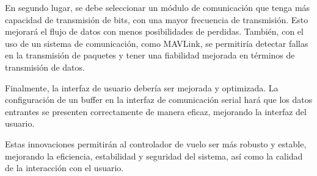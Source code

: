 En segundo lugar, se debe seleccionar un módulo de comunicación que tenga más capacidad de transmisión de bits, con  una mayor frecuencia de transmisión. Esto mejorará el flujo de datos con menos posibilidades de perdidas. También, con el uso de un sistema de comunicación, como MAVLink, se permitiría detectar fallas en la transmisión de paquetes y tener una fiabilidad mejorada en términos de transmisión de datos.\vspace{5px}

Finalmente, la interfaz de usuario debería ser mejorada y optimizada. La configuración de un buffer en la interfaz de comunicación serial hará que los datos entrantes se presenten correctamente de manera eficaz, mejorando la interfaz del usuario. \vspace{5px}

Estas innovaciones permitirán al controlador de vuelo ser más robusto y estable, mejorando la eficiencia, estabilidad y seguridad del sistema, así como la calidad de la interacción con el usuario.